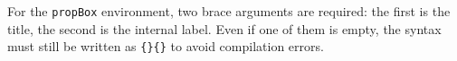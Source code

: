 \documentclass[a4paper,12pt]{article} %
\begin{document}
\noindent
For the \texttt{propBox} environment, two brace arguments are required: the first is the title, the second is the internal label. Even if one of them is empty, the syntax must still be written as \texttt{\{\}\{\}} to avoid compilation errors.

\def\slides{slides/sample-2.pdf}


\def\slides{slides/sample-2.pdf}








\end{document}
